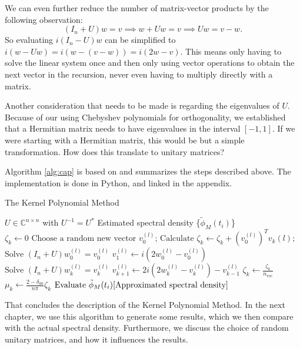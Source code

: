We can even further reduce the number of matrix-vector products by the following observation: 
\[
(I_n + U) w = v \implies w + Uw = v \implies Uw = v - w.
\]
So evaluating $i(I_n - U)w$ can be simplified to $i(w - Uw) = i(w - (v - w)) = i(2w - v)$. This means only having to solve the linear system once and then only using vector operations to obtain the next vector in the recursion, never even having to multiply directly with a matrix.

Another consideration that needs to be made is regarding the eigenvalues of $U$. Because of our using Chebyshev polynomials for orthogonality, we established that a Hermitian matrix needs to have eigenvalues in the interval $[-1, 1]$. If we were starting with a Hermitian matrix, this would be but a simple transformation. How does this translate to unitary matrices?

Algorithm \ref{alg:cap} is based on \cite[p.~10]{linsaadyang14} and summarizes the steps described above.
The implementation is done in Python, and linked in the appendix.

\begin{algorithm}[H]
    \caption{The Kernel Polynomial Method}\label{alg:cap}
    \begin{algorithmic}[5]
    \Require $U \in \mathbb{C}^{n \times n}$ with $U^{-1} = U^*$
    \Ensure Estimated spectral density \{$\tilde{\phi}_M(t_i)$\}\\
    \State $\zeta_k \gets 0$
    \EndFor
    \State $\text{Choose a random new vector } v_0^{(l)}\text{;}$ 
    \State $\text{Calculate } \zeta_k \gets \zeta_k + \left( v_0^{(l)} \right)^T v_k{(l)}\text{;}$  
    \State $\text{Solve } (I_n + U) w_0^{(l)} = v_0^{(l)}$
    \State $v_1^{(l)} \gets i (2w_0^{(l)} - v_0^{(l)})$
    \Else
    \State $\text{Solve } (I_n + U) w_k^{(l)} = v_k^{(l)}$
    \State $v_{k+1}^{(l)} \gets 2 i (2w_k^{(l)} - v_k^{(l)}) - v_{k-1}^{(l)}$ 
    \EndIf
    \EndFor
    \EndFor
    \State $\zeta_k \gets \frac{\zeta_k}{n_{\text{vec}}}$
    \State $\mu_k \gets \frac{2 - \delta_{k0}}{n \pi} \zeta_k$
    \EndFor
    \State $\text{Evaluate } \tilde{\phi}_M(t_i) \eqref{Approximated spectral density}$
    \end{algorithmic}
\end{algorithm}

That concludes the description of the Kernel Polynomial Method. In the next chapter, we use this algorithm to generate some results, which we then compare with the actual spectral density. Furthermore, we discuss the choice of random unitary matrices, and how it influences the results.